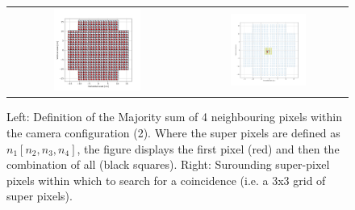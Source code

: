 \documentclass[GCT,short]{gct}
\begin{document}
\begin{figure}
\centering
\begin{tabular}{cc}
\includegraphics[width=0.51\textwidth]{../14_defaultTrigger/super_pixels.png} & \includegraphics[width=0.5\textwidth]{../14_defaultTrigger/super_pixel_neighbours.png} \\
\end{tabular}
\caption{Left: Definition of the Majority sum of 4 neighbouring pixels within the camera configuration (2). Where the super pixels are defined as $n_1 [n_2,n_3,n_4]$, the figure displays the first pixel (red) and then the combination of all (black squares). Right: Surounding super-pixel pixels within which to search for a coincidence (i.e. a 3x3 grid of super pixels). }
\label{fig:triggerpattern}
\end{figure}
\end{document}
